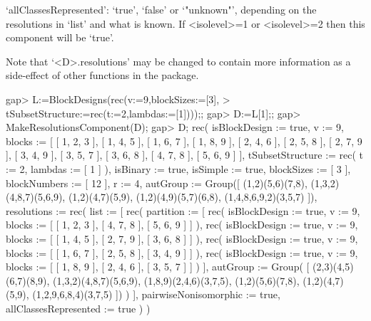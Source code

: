 `allClassesRepresented': `true', `false' or `"unknown"', depending on the
resolutions in `list' and what is known. If <isolevel>=1 or <isolevel>=2
then this component will be `true'.

Note that `<D>.resolutions' may be changed to contain more information
as a side-effect of other functions in the {\DESIGN} package.

\beginexample
gap> L:=BlockDesigns(rec(v:=9,blockSizes:=[3],
>          tSubsetStructure:=rec(t:=2,lambdas:=[1])));;
gap> D:=L[1];;
gap> MakeResolutionsComponent(D);
gap> D;
rec( isBlockDesign := true, v := 9, 
  blocks := [ [ 1, 2, 3 ], [ 1, 4, 5 ], [ 1, 6, 7 ], [ 1, 8, 9 ], 
      [ 2, 4, 6 ], [ 2, 5, 8 ], [ 2, 7, 9 ], [ 3, 4, 9 ], [ 3, 5, 7 ], 
      [ 3, 6, 8 ], [ 4, 7, 8 ], [ 5, 6, 9 ] ], 
  tSubsetStructure := rec( t := 2, lambdas := [ 1 ] ), isBinary := true, 
  isSimple := true, blockSizes := [ 3 ], blockNumbers := [ 12 ], r := 4, 
  autGroup := Group([ (1,2)(5,6)(7,8), (1,3,2)(4,8,7)(5,6,9), (1,2)(4,7)(5,9),
      (1,2)(4,9)(5,7)(6,8), (1,4,8,6,9,2)(3,5,7) ]), 
  resolutions := rec( list := [ rec( partition := 
                [ rec( isBlockDesign := true, v := 9, 
                      blocks := [ [ 1, 2, 3 ], [ 4, 7, 8 ], [ 5, 6, 9 ] ] ), 
                  rec( isBlockDesign := true, v := 9, 
                      blocks := [ [ 1, 4, 5 ], [ 2, 7, 9 ], [ 3, 6, 8 ] ] ), 
                  rec( isBlockDesign := true, v := 9, 
                      blocks := [ [ 1, 6, 7 ], [ 2, 5, 8 ], [ 3, 4, 9 ] ] ), 
                  rec( isBlockDesign := true, v := 9, 
                      blocks := [ [ 1, 8, 9 ], [ 2, 4, 6 ], [ 3, 5, 7 ] ] ) ],
              autGroup := Group(
                [ (2,3)(4,5)(6,7)(8,9), (1,3,2)(4,8,7)(5,6,9), 
                  (1,8,9)(2,4,6)(3,7,5), (1,2)(5,6)(7,8), (1,2)(4,7)(5,9), 
                  (1,2,9,6,8,4)(3,7,5) ]) ) ], pairwiseNonisomorphic := true, 
      allClassesRepresented := true ) )
\endexample
